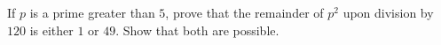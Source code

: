 If $p$ is a prime greater than $5$, prove that the remainder of $p^2$ upon division by $120$ is either $1$ or $49$. Show that both are possible.
